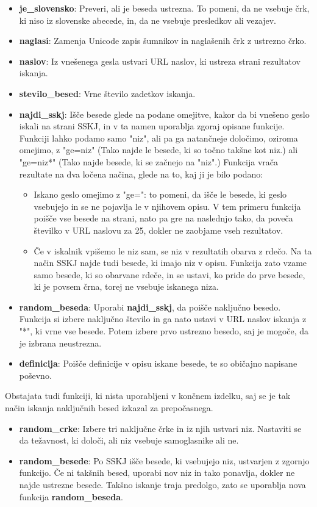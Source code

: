 \documentclass [a4paper, 12pt] {article}
\begin{document}
\begin {itemize}
\item \textbf {je\_slovensko}: Preveri, ali je beseda ustrezna. To pomeni, da ne vsebuje črk, ki niso iz slovenske abecede, in, da ne vsebuje presledkov ali vezajev.
\item \textbf {naglasi}: Zamenja Unicode zapis šumnikov in naglašenih črk z ustrezno črko.
\item \textbf {naslov}: Iz vnešenega gesla ustvari URL naslov, ki ustreza strani rezultatov iskanja.
\item \textbf {stevilo\_besed}: Vrne število zadetkov iskanja.
\item \textbf {najdi\_sskj}: Išče besede glede na podane omejitve, kakor da bi vnešeno geslo iskali na strani SSKJ, in v ta namen uporablja zgoraj opisane funkcije. Funkciji lahko podamo samo "niz", ali pa ga natančneje določimo, oziroma omejimo, z "ge=niz" (Tako najde le besede, ki so točno takšne kot niz.) ali "ge=niz*" (Tako najde besede, ki se začnejo na "niz".) Funkcija vrača rezultate na dva ločena načina, glede na to, kaj ji je bilo podano:
\begin {itemize}
\item Iskano geslo omejimo z "ge=": to pomeni, da išče le besede, ki geslo vsebujejo in se ne pojavlja le v njihovem opisu. V tem primeru funkcija poišče vse besede na strani, nato pa gre na naslednjo tako, da poveča številko v URL naslovu za 25, dokler ne zaobjame vseh rezultatov.
\item Če v iskalnik vpišemo le niz sam, se niz v rezultatih obarva z rdečo. Na ta način SSKJ najde tudi besede, ki imajo niz v opisu. Funkcija zato vzame samo besede, ki so obarvane rdeče, in se ustavi, ko pride do prve besede, ki je povsem črna, torej ne vsebuje iskanega niza.
\end {itemize}
\item \textbf {random\_beseda}: Uporabi \textbf {najdi\_sskj}, da poišče naključno besedo. Funkcija si izbere naključno število in ga nato ustavi v URL naslov iskanja z "*", ki vrne vse besede. Potem izbere prvo ustrezno besedo, saj je mogoče, da je izbrana neustrezna.
\item \textbf {definicija}: Poišče definicije v opisu iskane besede, te so običajno napisane poševno.
\end {itemize} 
Obstajata tudi funkciji, ki nista uporabljeni v končnem izdelku, saj se je tak način iskanja naključnih besed izkazal za prepočasnega.
\begin {itemize}
\item \textbf {random\_crke}: Izbere tri naključne črke in iz njih ustvari niz. Nastaviti se da težavnost, ki določi, ali niz vsebuje samoglasnike ali ne.
\item \textbf {random\_besede}: Po SSKJ išče besede, ki vsebujejo niz, ustvarjen z zgornjo funkcijo. Če ni takšnih besed, uporabi nov niz in tako ponavlja, dokler ne najde ustrezne besede. Takšno iskanje traja predolgo, zato se uporablja nova funkcija \textbf {random\_beseda}.
\end {itemize}
\end{document}
